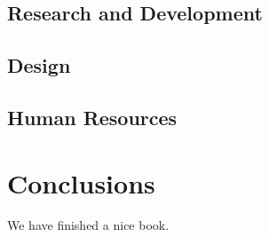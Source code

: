 \documentclass[]{book}
\begin{document}
\section{Research and Development}\label{research-and-development-1}

\section{Design}\label{design-1}

\section{Human Resources}\label{human-resources-1}

\chapter{Conclusions}\label{conclusions}

We have finished a nice book.


\end{document}
